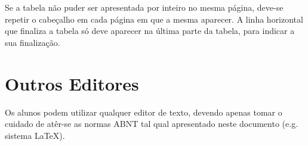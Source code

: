 \documentclass[repeatfields,xlists,xpacks,oneside,yearsonly]{ufrgscca}
\begin{document}
\begin{appendix}
        Se a tabela não puder ser apresentada por inteiro no mesma página, deve-se
        repetir o cabeçalho em cada página em que a mesma aparecer. A linha horizontal que
        finaliza a tabela só deve aparecer na última parte da tabela, para indicar a
        sua finalização.




        \chapter{Outros Editores}

        Os alunos podem utilizar qualquer editor de texto, devendo apenas tomar o cuidado de atêr-se as normas ABNT tal qual apresentado neste documento (e.g. sistema \LaTeX).

    \end{appendix}
\end{document}
